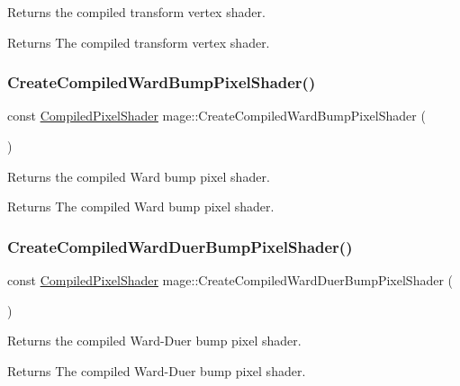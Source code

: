Returns the compiled transform vertex shader.

\begin{DoxyReturn}{Returns}
The compiled transform vertex shader. 
\end{DoxyReturn}
\hypertarget{namespacemage_ae88a73f8381c00a439296b7ae7aa3a5b}{}\label{namespacemage_ae88a73f8381c00a439296b7ae7aa3a5b} 
\subsubsection{\texorpdfstring{Create\+Compiled\+Ward\+Bump\+Pixel\+Shader()}{CreateCompiledWardBumpPixelShader()}}
{\footnotesize\ttfamily const \hyperlink{structmage_1_1_compiled_pixel_shader}{Compiled\+Pixel\+Shader} mage\+::\+Create\+Compiled\+Ward\+Bump\+Pixel\+Shader (\begin{DoxyParamCaption}{ }\end{DoxyParamCaption})}

Returns the compiled Ward bump pixel shader.

\begin{DoxyReturn}{Returns}
The compiled Ward bump pixel shader. 
\end{DoxyReturn}
\hypertarget{namespacemage_a99a43ed16bebc67104450ff24123e798}{}\label{namespacemage_a99a43ed16bebc67104450ff24123e798} 
\subsubsection{\texorpdfstring{Create\+Compiled\+Ward\+Duer\+Bump\+Pixel\+Shader()}{CreateCompiledWardDuerBumpPixelShader()}}
{\footnotesize\ttfamily const \hyperlink{structmage_1_1_compiled_pixel_shader}{Compiled\+Pixel\+Shader} mage\+::\+Create\+Compiled\+Ward\+Duer\+Bump\+Pixel\+Shader (\begin{DoxyParamCaption}{ }\end{DoxyParamCaption})}

Returns the compiled Ward-\/\+Duer bump pixel shader.

\begin{DoxyReturn}{Returns}
The compiled Ward-\/\+Duer bump pixel shader. 
\end{DoxyReturn}
\hypertarget{namespacemage_a33fc975c5f0d617fa4a2127f6be88a47}{}\label{namespacemage_a33fc975c5f0d617fa4a2127f6be88a47} 
